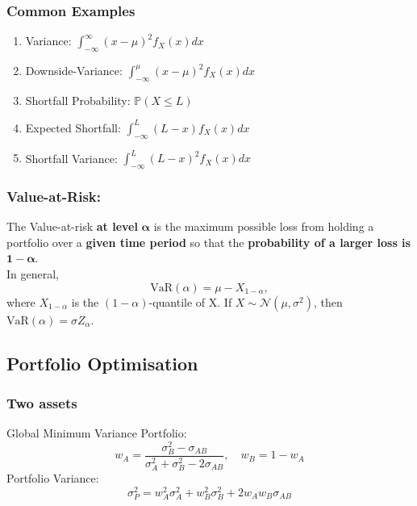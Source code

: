 \documentclass[11pt]{article}
\newcommand{\PR}{\mathbb{P}}
\begin{document}
	\subsubsection{Common Examples}
	\begin{enumerate}
		\item Variance: \( \int_{-\infty}^{\infty} (x - \mu)^2 f_{X}(x)dx \)
		\item Downside-Variance: \( \int_{-\infty}^{\mu} (x - \mu)^2 f_{X}(x)dx \)
		\item Shortfall Probability: \( \PR(X \leq L ) \)
		\item Expected Shortfall: \( \int_{-\infty}^{L}(L-x)f_{X}(x)dx \)
		\item Shortfall Variance: \( \int_{-\infty}^{L}(L-x)^2  f_{X}(x)dx \)
	\end{enumerate}
	\subsubsection{Value-at-Risk:}
	The Value-at-risk \textbf{at level }\( \bm{\alpha} \) is the maximum possible loss from holding a portfolio over a \textbf{given time period} so that the \textbf{probability of a larger loss is} \(\bm{1 - \alpha}  \).\\
	In general, 
	\[	\text{VaR}(\alpha) = \mu - X_{1 - \alpha},
		\]
	where \( X_{1-\alpha} \) is the \( (1 - \alpha) \)-quantile of X.
	If \( X\sim\mathcal{N}(\mu, \sigma^2) \), then 
	\(	\text{VaR}(\alpha) = \sigma Z_{\alpha}
		\).
	\subsection{Portfolio Optimisation}
	\subsubsection{Two assets}
	Global Minimum Variance Portfolio: \[	w_A = \frac{\sigma^2_B - \sigma_{AB}}{\sigma^2_A + \sigma^2_B - 2\sigma_{AB}},\quad w_B = 1 - w_A\]
	Portfolio Variance:
	\[	\sigma_P^2 = w_A^2 \sigma_A^2 + w_B^2 \sigma_B^2 + 2w_A w_B\sigma_{AB}\]
	
\end{document}
